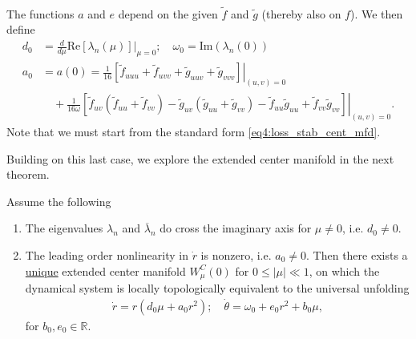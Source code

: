 \begin{enumerate}
\begin{subequations}
\begin{align}
\end{align}\end{subequations}
The functions $a$ and $e$ depend on the given $\tilde{f}$ and $\tilde{g}$ (thereby also on $f$). We then define
\begin{subequations}
\begin{align}
	d_0 &= \frac{d}{d\mu } \textrm{Re} \left.\left[ \lambda _n(\mu ) \right] \right|_{\mu =0}; 
		\quad \omega_0= \textrm{Im} (\lambda_n(0 ))\\
		a_0 &= a(0) = \frac{1}{16}\left. \left[\tilde{f}_{uuu} + \tilde{f}_{uvv} + \tilde{g}_{uuv} + \tilde{g}_{vvv}\right] \right|_{(u,v)=0} \\
		    &\quad +\frac{1}{16\omega } \left. \left[\tilde{f}_{uv}(\tilde{f}_{uu}+ \tilde{f}_{vv}) - \tilde{g}_{uv}(\tilde{g}_{uu}+\tilde{g}_{vv}) - \tilde{f}_{uu} \tilde{g}_{uu} + \tilde{f}_{vv}\tilde{g}_{vv}\right]\right|_{(u,v)=0}.
\end{align}
\end{subequations}
Note that we must start from the standard form \eqref{eq4:loss_stab_cent_mfd}. 
\end{enumerate}
Building on this last case, we explore the extended center manifold in the next theorem.

\begin{theorem}
	Assume the following
	\begin{enumerate}
		\item The eigenvalues $\lambda_n$ and $\overline{\lambda}_{n} $ do cross the imaginary axis for $\mu \neq 0$, i.e. $d_0 \neq 0$.
		\item The leading order nonlinearity in $\dot{r}$ is nonzero, i.e. $a_0 \neq 0$.
			Then there exists a \underline{unique} extended center manifold $W^{C}_{\mu }(0)$ for $0 \leq |\mu | \ll 1$, on which the dynamical system is locally topologically equivalent to the universal unfolding 
			\begin{align}
			\boxed{
			\dot{r} = r \left( d_0 \mu + a_0 r^2\right); \quad 
			\dot{\theta}= \omega_0 + e_0r^2 + b_0 \mu ,}
			\end{align}
		for $b_0, e_0 \in \mathbb{R}$.	
	\end{enumerate}
\end{theorem}

